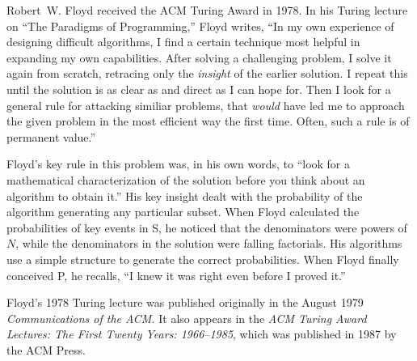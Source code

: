 Robert~W. Floyd received the ACM Turing Award in 1978. In his Turing lecture on
``The Paradigms of Programming,'' Floyd writes, ``In my own experience of
designing difficult algorithms, I find a certain technique most helpful in
expanding my own capabilities. After solving a challenging problem, I solve it
again from scratch, retracing only the {\it insight\/} of the earlier solution.
I repeat this until the solution is as clear as and direct as I can hope for.
Then I look for a general rule for attacking similiar problems, that
{\it would\/} have led me to approach the given problem in the most efficient
way the first time. Often, such a rule is of permanent value.''

Floyd's key rule in this problem was, in his own words, to ``look for a
mathematical characterization of the solution before you think about an
algorithm to obtain it.'' His key insight dealt with the probability of the
algorithm generating any particular subset. When Floyd calculated the
probabilities of key events in \alg S, he noticed that the denominators were
powers of $N$, while the denominators in the solution were falling factorials.
His algorithms use a simple structure to generate the correct probabilities.
When Floyd finally conceived \alg P, he recalls, ``I knew it was right even
before I proved it.''

Floyd's 1978 Turing lecture was published originally in the August 1979
{\sl Communications of the ACM\/.} It also appears in the {\sl ACM Turing Award
Lectures: The First Twenty Years: 1966--1985\/}, which was published in 1987 by
the ACM Press.
 
\bye
